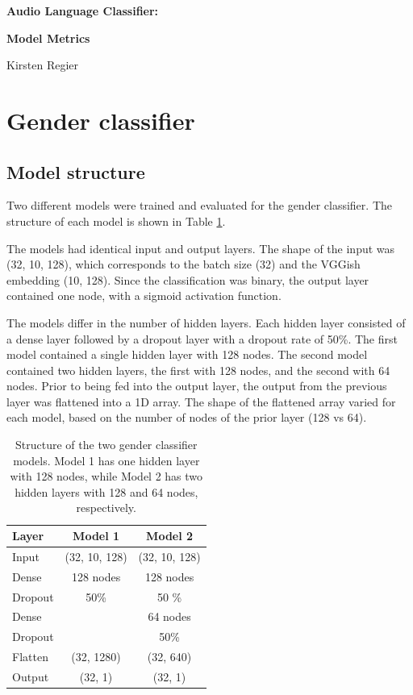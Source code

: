 \documentclass[11pt, letterpaper]{article}
\begin{document}
\begin{center}
\Large{\textbf{Audio Language Classifier:}}

\Large{\textbf{Model Metrics}}

\large{Kirsten Regier}
\end{center}

\section{Gender classifier}
\subsection{Model structure}

Two different models were trained and evaluated for the gender classifier. The structure of each model is shown in Table \ref{tab:GenModels}. 

The models had identical input and output layers. The shape of the input was (32, 10, 128), which corresponds to the batch size (32) and the VGGish embedding (10, 128).  Since the classification was binary, the output layer contained one node, with a sigmoid activation function.

The models differ in the number of hidden layers. Each hidden layer consisted of a dense layer followed by a dropout layer with a dropout rate of 50\%. The first model contained a single hidden layer with 128 nodes. The second model contained two hidden layers, the first with 128 nodes, and the second with 64 nodes. Prior to being fed into the output layer, the output from the previous layer was flattened into a 1D array. The shape of the flattened array varied for each model, based on the number of nodes of the prior layer (128 vs 64).

\begin{table}[!h]
\begin{center}
\caption{Structure of the two gender classifier models. Model 1 has one hidden layer with 128 nodes, while Model 2 has two hidden layers with 128 and 64 nodes, respectively.}
\begin{tabular}{l | c | c |}

Layer  & Model 1 & Model 2\\
\hline

Input 	& (32, 10, 128) & (32, 10, 128) \\ \hline

Dense	& 128 nodes & 128 nodes \\
Dropout	& 50\%		& 50 \% \\ \hline

Dense	&			& 64 nodes \\
Dropout	& 			& 50\% \\ \hline

Flatten 	& (32, 1280)	& (32, 640) \\ \hline
Output 	& (32, 1)		& (32, 1)\\
\hline
\end{tabular}

\label{tab:GenModels}
\end{center}
\end{table}
\end{document}
